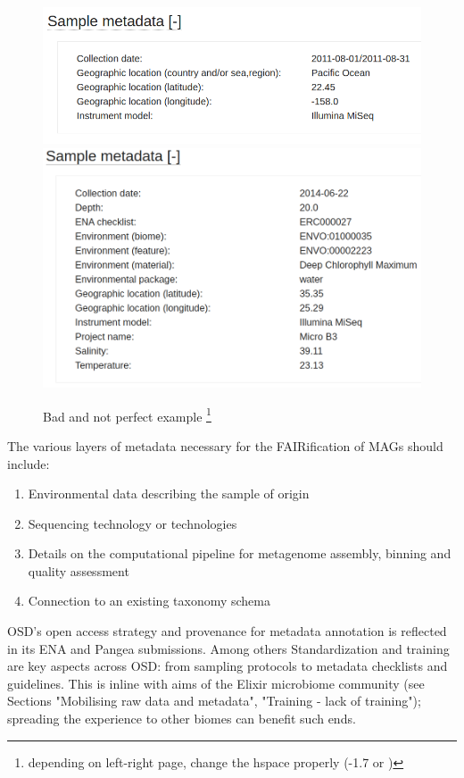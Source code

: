       \begin{figure}[!h]
         \hspace*{-1.7in}
         \includegraphics[width=.75\textwidth]{figures/SRS1753450_metadata.png}
         \includegraphics[width=.75\textwidth]{figures/ERS667566_metadata.png}
         \caption[Samples metadata examples MGnify]{Bad and not perfect example
         \footnote{depending on left-right page, change the hspace properly (-1.7 or )}}
         \label{fig:metadata_examples}
      \end{figure}
      


      The various layers of metadata necessary for the FAIRification of MAGs should include:
      \begin{enumerate}
         \item Environmental data describing the sample of origin
         \item Sequencing technology or technologies
         \item Details on the computational pipeline for metagenome assembly, binning and quality assessment
         \item Connection to an existing taxonomy schema
      \end{enumerate}


      OSD’s open access strategy and provenance for metadata annotation is reflected in its ENA and Pangea submissions. 
      Among others Standardization and training are key aspects across OSD: from sampling protocols to metadata checklists and guidelines. 
      This is inline with aims of the Elixir microbiome community (see Sections "Mobilising raw data and metadata", 
      "Training - lack of training"); 
      spreading the experience to other biomes can benefit such ends.




